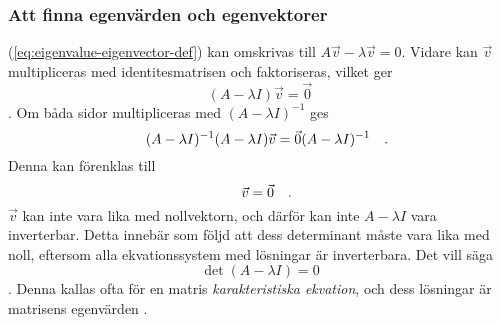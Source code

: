 \subsubsection{Att finna egenvärden och egenvektorer}\label{sec:eigenvalues_vectors}
(\ref{eq:eigenvalue-eigenvector-def}) kan omskrivas till \(A\vec{v}-\lambda\vec{v}=0\). Vidare kan \(\vec{v}\) multipliceras med identitesmatrisen och faktoriseras, vilket ger
\begin{equation}
    (A-\lambda I)\vec{v}=\vec{0}
\end{equation} \parencite[247]{margalit_interactive_2019}. Om båda sidor multipliceras med \((A-\lambda I)^{-1}\) ges
\begin{equation}
    (A-\lambda I)^{-1}(A-\lambda I)\vec{v}=\vec{0}(A-\lambda I)^{-1}
\quad\mathrm{.}\!\!\!\!\!\!\end{equation} Denna kan förenklas till
\begin{equation}
    \vec{v}=\vec{0}
\quad\mathrm{.}\!\!\!\!\!\!\end{equation} \(\vec{v}\) kan inte vara lika med nollvektorn, och därför kan inte \(A-\lambda I\) vara inverterbar. Detta innebär som följd att dess determinant måste vara lika med noll, eftersom alla ekvationssystem med lösningar är inverterbara. Det vill säga
\begin{equation}
    \det(A-\lambda I)=0
\end{equation} \parencite[286-287]{strang_introduction_2009}. Denna kallas ofta för en matris \emph{karakteristiska ekvation}, och dess lösningar är matrisens egenvärden \parencite[338]{zill_differential_2005}.

